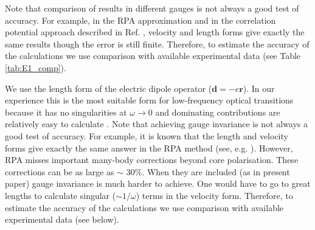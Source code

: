 \documentclass[8pt,a4paper, twoside]{report}
\begin{document}
Note that comparison of results in different gauges is not always a good test of accuracy. For example, in the RPA approximation and in the correlation potential approach described in Ref. \cite{DFSS1987_2, DFSS1987}, velocity and length forms give exactly the same results though the error is still finite. Therefore, to estimate the accuracy of the calculations we use comparison with available experimental data (see Table \ref{tab:E1_comp}).\\





\iffalse

 We use the length form of the electric dipole operator ($\mathbf{d} = -e\mathbf{r}$). In our experience this is the most suitable form for low-frequency optical transitions because it has no singularities at $\omega \rightarrow 0$ and dominating contributions are relatively easy to calculate \cite{DFSS1987_2, DFSS1987}. Note that achieving gauge invariance is not always a good test of accuracy. For example, it is known that the length and velocity forms give exactly the same answer in the RPA method (see, e.g. \cite{DzuFlaSilSus87, DFSS1986}). However, RPA misses important many-body corrections beyond core polarisation. These corrections can be as large as $\sim$ 30\%. When they are included (as in present paper) gauge invariance is much harder to achieve. One would have to go to great lengths to calculate singular ($\sim 1/\omega$) terms in the velocity form. Therefore, to estimate the accuracy of the calculations we use comparison with available experimental data (see below).\\
\end{document}
